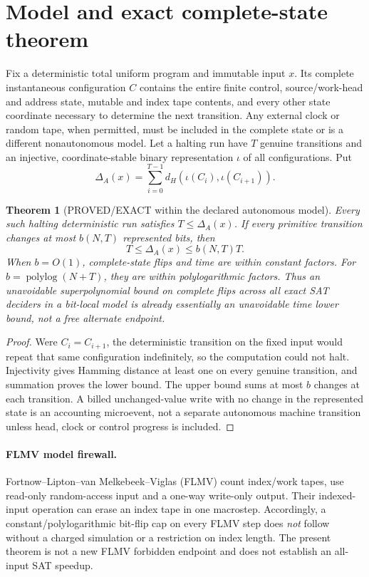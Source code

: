 \documentclass[11pt]{article}
\newtheorem{theorem}{Theorem}
\begin{document}
\section{Model and exact complete-state theorem}
Fix a deterministic total uniform program and immutable input $x$. Its complete instantaneous configuration $C$ contains the entire finite control, source/work-head and address state, mutable and index tape contents, and every other state coordinate necessary to determine the next transition. Any external clock or random tape, when permitted, must be included in the complete state or is a different nonautonomous model. Let a halting run have $T$ genuine transitions and an injective, coordinate-stable binary representation $\iota$ of all configurations. Put
\[
\Delta_A(x)=\sum_{i=0}^{T-1}d_H(\iota(C_i),\iota(C_{i+1})).
\]
\begin{theorem}[PROVED/EXACT within the declared autonomous model]
Every such halting deterministic run satisfies $T\le\Delta_A(x)$. If every primitive transition changes at most $b(N,T)$ represented bits, then
\[
\boxed{T\le \Delta_A(x)\le b(N,T)T.}
\]
When $b=O(1)$, complete-state flips and time are within constant factors. For $b=\operatorname{polylog}(N+T)$, they are within polylogarithmic factors. Thus an unavoidable superpolynomial bound on \emph{complete} flips across all exact SAT deciders in a bit-local model is already essentially an unavoidable time lower bound, not a free alternate endpoint.
\end{theorem}
\begin{proof}
Were $C_i=C_{i+1}$, the deterministic transition on the fixed input would repeat that same configuration indefinitely, so the computation could not halt. Injectivity gives Hamming distance at least one on every genuine transition, and summation proves the lower bound. The upper bound sums at most $b$ changes at each transition. A billed unchanged-value write with no change in the represented state is an accounting microevent, not a separate autonomous machine transition unless head, clock or control progress is included.
\end{proof}
\paragraph{FLMV model firewall.} Fortnow--Lipton--van Melkebeek--Viglas (FLMV) count index/work tapes, use read-only random-access input and a one-way write-only output. Their indexed-input operation can erase an index tape in one macrostep. Accordingly, a constant/polylogarithmic bit-flip cap on every FLMV step does \emph{not} follow without a charged simulation or a restriction on index length. The present theorem is not a new FLMV forbidden endpoint and does not establish an all-input SAT speedup.
\end{document}
